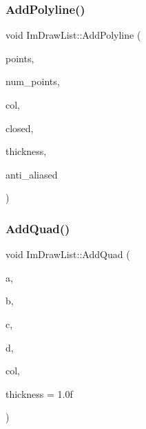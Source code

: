 \hypertarget{struct_im_draw_list_a3ca939b6e4b35a93611d2d42d7e20434}{}\label{struct_im_draw_list_a3ca939b6e4b35a93611d2d42d7e20434} 
\subsubsection{\texorpdfstring{Add\+Polyline()}{AddPolyline()}}
{\footnotesize\ttfamily void Im\+Draw\+List\+::\+Add\+Polyline (\begin{DoxyParamCaption}\item[{const \hyperlink{struct_im_vec2}{Im\+Vec2} $\ast$}]{points,  }\item[{const int}]{num\+\_\+points,  }\item[{Im\+U32}]{col,  }\item[{bool}]{closed,  }\item[{float}]{thickness,  }\item[{bool}]{anti\+\_\+aliased }\end{DoxyParamCaption})}

\hypertarget{struct_im_draw_list_ac3fd62862000b2a7a4e7f61da0a4e3fd}{}\label{struct_im_draw_list_ac3fd62862000b2a7a4e7f61da0a4e3fd} 
\subsubsection{\texorpdfstring{Add\+Quad()}{AddQuad()}}
{\footnotesize\ttfamily void Im\+Draw\+List\+::\+Add\+Quad (\begin{DoxyParamCaption}\item[{const \hyperlink{struct_im_vec2}{Im\+Vec2} \&}]{a,  }\item[{const \hyperlink{struct_im_vec2}{Im\+Vec2} \&}]{b,  }\item[{const \hyperlink{struct_im_vec2}{Im\+Vec2} \&}]{c,  }\item[{const \hyperlink{struct_im_vec2}{Im\+Vec2} \&}]{d,  }\item[{Im\+U32}]{col,  }\item[{float}]{thickness = {\ttfamily 1.0f} }\end{DoxyParamCaption})}

\hypertarget{struct_im_draw_list_abefdc71c2dc6b6331193aee3ff680ed0}{}\label{struct_im_draw_list_abefdc71c2dc6b6331193aee3ff680ed0} 
